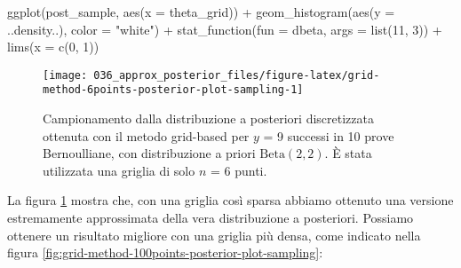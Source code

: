 \documentclass[
]{memoir}
\newenvironment{Shaded}{\begin{snugshade}}{\end{snugshade}}
\newcommand{\AttributeTok}[1]{\textcolor[rgb]{0.77,0.63,0.00}{#1}}
\newcommand{\DecValTok}[1]{\textcolor[rgb]{0.00,0.00,0.81}{#1}}
\newcommand{\FunctionTok}[1]{\textcolor[rgb]{0.00,0.00,0.00}{#1}}
\newcommand{\NormalTok}[1]{#1}
\newcommand{\SpecialCharTok}[1]{\textcolor[rgb]{0.00,0.00,0.00}{#1}}
\newcommand{\StringTok}[1]{\textcolor[rgb]{0.31,0.60,0.02}{#1}}
\begin{document}
\begin{Shaded}
\begin{Highlighting}[]
\FunctionTok{ggplot}\NormalTok{(post\_sample, }\FunctionTok{aes}\NormalTok{(}\AttributeTok{x =}\NormalTok{ theta\_grid)) }\SpecialCharTok{+}
  \FunctionTok{geom\_histogram}\NormalTok{(}\FunctionTok{aes}\NormalTok{(}\AttributeTok{y =}\NormalTok{ ..density..), }\AttributeTok{color =} \StringTok{"white"}\NormalTok{) }\SpecialCharTok{+}
  \FunctionTok{stat\_function}\NormalTok{(}\AttributeTok{fun =}\NormalTok{ dbeta, }\AttributeTok{args =} \FunctionTok{list}\NormalTok{(}\DecValTok{11}\NormalTok{, }\DecValTok{3}\NormalTok{)) }\SpecialCharTok{+}
  \FunctionTok{lims}\NormalTok{(}\AttributeTok{x =} \FunctionTok{c}\NormalTok{(}\DecValTok{0}\NormalTok{, }\DecValTok{1}\NormalTok{))}
\end{Highlighting}
\end{Shaded}

\begin{figure}

{\centering \texttt{[image: 036\_approx\_posterior\_files/figure-latex/grid-method-6points-posterior-plot-sampling-1]} 

}

\caption{Campionamento dalla  distribuzione a posteriori discretizzata ottenuta con il metodo grid-based per $y$ = 9 successi in 10 prove Bernoulliane, con distribuzione a priori $\mbox{Beta}(2, 2)$. È stata utilizzata una griglia di solo $n$ = 6 punti.}\label{fig:grid-method-6points-posterior-plot-sampling}
\end{figure}

\noindent
La figura \ref{fig:grid-method-6points-posterior-plot-sampling} mostra che, con una griglia così sparsa abbiamo ottenuto una versione estremamente approssimata della vera distribuzione a posteriori. Possiamo ottenere un risultato migliore con una griglia più densa, come indicato nella figura \ref{fig:grid-method-100points-posterior-plot-sampling}:
\end{document}
